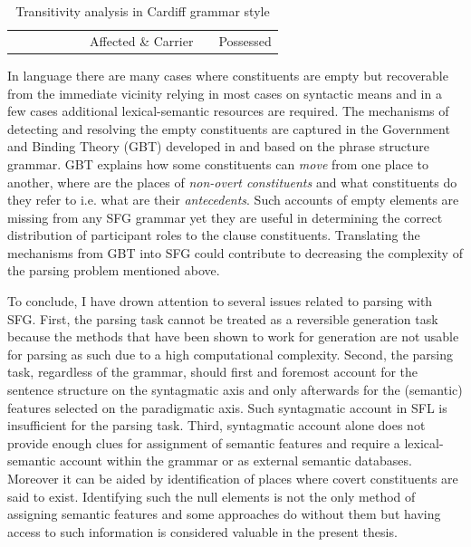 \begin{table}[!ht]
{\begin{tabular}{cccccc|c|c|c|c|c|}
            &                             &                                      &                         &                                     &                & Affected \& Carrier &                  & \multicolumn{3}{c|}{Possessed}                 \\ \cline{7-7} \cline{9-11} 
        \end{tabular}%
    }
    \caption{Transitivity analysis in Cardiff grammar style \citep{Neale2002,Fawcett2009}}
    \label{tab:glance-analsys-semantic}
\end{table}

In language there are many cases where constituents are empty but recoverable from the immediate vicinity relying in most cases on syntactic means and in a few cases additional lexical-semantic resources are required. The mechanisms of detecting and resolving the empty constituents are captured in the Government and Binding Theory (GBT) developed in \citep{Chomsky81, Chomsky1982, Chomsky1986} and based on the phrase structure grammar. GBT explains how some constituents can \textit{move} from one place to another, where are the places of \textit{non-overt constituents} and what constituents do they refer to i.e. what are their \textit{antecedents}. Such accounts of empty elements are missing from any SFG grammar yet they are useful in determining the correct distribution of participant roles to the clause constituents. Translating the mechanisms from GBT into SFG could contribute to decreasing the complexity of the parsing problem mentioned above.


To conclude, I have drown attention to several issues related to parsing with SFG. First, the parsing task cannot be treated as a reversible generation task because the methods that have been shown to work for generation are not usable for parsing as such due to a high computational complexity. Second, the parsing task, regardless of the grammar, should first and foremost account for the sentence structure on the syntagmatic axis and only afterwards for the (semantic) features selected on the paradigmatic axis. Such syntagmatic account in SFL is insufficient for the parsing task. Third, syntagmatic account alone does not provide enough clues for assignment of semantic features and require a lexical-semantic account within the grammar or as external semantic databases. Moreover it can be aided by identification of places where covert constituents are said to exist. Identifying such the null elements is not the only method of assigning semantic features and some approaches do without them but having access to such information is considered valuable in the present thesis.

